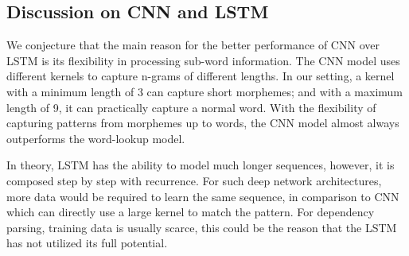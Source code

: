 \documentclass[11pt,a4paper]{article}
\begin{document}
  \subsection{Discussion on CNN and LSTM}

    We conjecture that the main reason for the better performance of CNN over LSTM is its flexibility in processing sub-word information.
    The CNN model uses different kernels to capture n-grams of different lengths. In our setting, a kernel with a minimum length of 3 can capture short morphemes; and with a maximum length of 9, it can practically capture a normal word. 
    With the flexibility of capturing patterns from morphemes up to words, the CNN model almost always outperforms the word-lookup model.

    In theory, LSTM has the ability to model much longer sequences, however, it is composed step by step with recurrence. For such deep network architectures, more data would be required to learn the same sequence, in comparison to CNN which can directly use a large kernel to match the pattern. 
    For dependency parsing, training data is usually scarce, this could be the reason that the LSTM has not utilized its full potential. 

    

\end{document}
